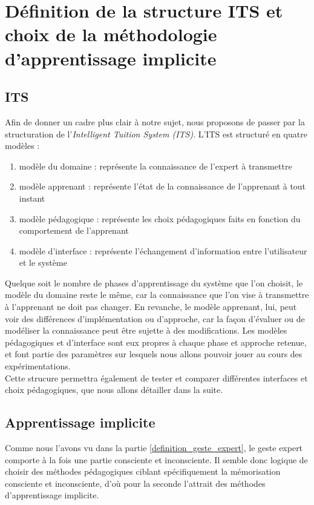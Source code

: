 \section{Définition de la structure ITS et choix de la méthodologie d'apprentissage implicite}

\subsection{ITS}
Afin de donner un cadre plus clair à notre sujet, nous proposons de passer par la structuration de l'\textit{Intelligent Tuition System (ITS)}.
L'ITS est structuré en quatre modèles \cite{MASCARET.Buche+} : 

\begin{enumerate}
    \item modèle du domaine : représente la connaissance de l'expert à transmettre
    \item modèle apprenant : représente l'état de la connaissance de l'apprenant à tout instant
    \item modèle pédagogique :  représente les choix pédagogiques faits en fonction du comportement de l'apprenant 
    \item modèle d'interface : représente l'échangement d'information entre l'utilisateur et le système 
\end{enumerate}

Quelque soit le nombre de phases d'apprentissage du système que l'on choisit, le modèle du domaine reste le même, car la connaissance que l'on vise à transmettre à l'apprenant ne doit pas changer. 
En revanche, le modèle apprenant, lui, peut voir des différences d'implémentation ou d'approche, car la façon d'évaluer ou de modéliser la connaissance peut être sujette à des modifications. 
Les modèles pédagogiques et d'interface sont eux propres à chaque phase et approche retenue, et font partie des paramètres sur lesquels nous allons pouvoir jouer au cours des expérimentations. \\

Cette strucure permettra également de tester et comparer différentes interfaces et choix pédagogiques, que nous allons détailler dans la suite. 


\subsection{Apprentissage implicite}

Comme nous l'avons vu dans la partie \ref{definition_geste_expert}, le geste expert comporte à la fois une partie consciente et inconsciente.
Il semble donc logique de choisir des méthodes pédagogiques ciblant spécifiquement la mémorisation consciente et inconsciente, d'où pour la seconde l'attrait des méthodes d'apprentissage implicite. \\

